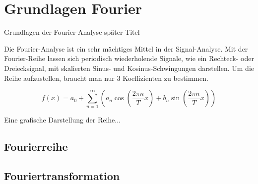 %
%
%
%
\section{Grundlagen Fourier\label{fourier:section:teil0}}


Grundlagen der Fourier-Analyse später Titel

Die Fourier-Analyse ist ein sehr mächtiges Mittel in der Signal-Analyse. 
Mit der Fourier-Reihe lassen sich periodisch wiederholende Signale, wie ein Rechteck- oder Dreiecksignal, mit skalierten Sinus- und Kosinus-Schwingungen darstellen.
Um die Reihe aufzustellen, braucht man nur 3 Koeffizienten zu bestimmen.

\[
f(x) = a_0 + \sum_{n=1}^{\infty} \left( a_n \cos\left( \frac{2\pi n}{T} x \right) + b_n \sin\left( \frac{2\pi n}{T} x \right) \right)
\]

Eine grafische Darstellung der Reihe...

\subsection{Fourierreihe\label{fourier:subsection:fourierreihe}}


\subsection{Fouriertransformation\label{fourier:subsection:fouriertransformation}}

